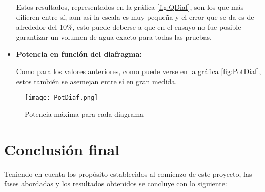 \begin{itemize}
  Estos resultados, representados en la gráfica \autoref{fig:QDiaf}, son los que más difieren entre sí, aun así la escala
  es muy pequeña y el error que se da es de alrededor del 10\%, esto
  puede deberse a que en el ensayo no fue posible garantizar un volumen
  de agua exacto para todas las pruebas.
\item
  \textbf{Potencia en función del diafragma:}

  Como para los valores anteriores, como puede verse en la gráfica \autoref{fig:PotDiaf}, estos también se asemejan entre sí
  en gran medida.
\end{itemize}

\begin{figure}
\centering
\texttt{[image: PotDiaf.png]}
\caption{Potencia máxima para cada diagrama}
\label{fig:PotDiaf}
\end{figure}

\section{Conclusión final}\label{sec:conclusion}

Teniendo en cuenta los propósito establecidos al comienzo de este
proyecto, las fases abordadas y los resultados obtenidos se concluye con
lo siguiente:

